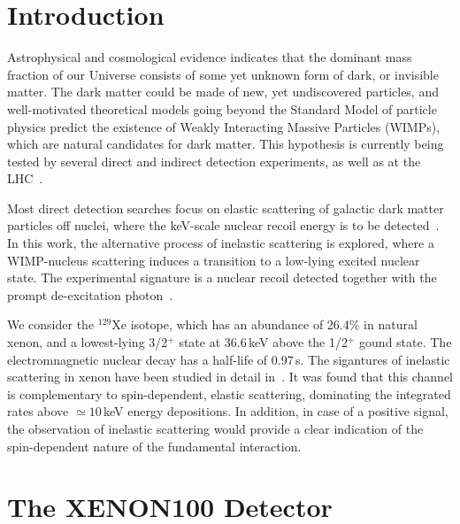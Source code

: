 \section{\label{sec:level1} Introduction}
Astrophysical and cosmological evidence indicates that the dominant mass fraction of our Universe consists of some yet unknown
form of dark, or invisible matter. The dark matter could be made of new, yet undiscovered particles, and well-motivated
theoretical models going beyond the Standard Model of particle physics predict the existence of Weakly Interacting Massive
Particles (WIMPs), which are natural candidates for dark matter. This hypothesis is currently being tested by several direct
and indirect detection experiments, as well as at the LHC~\cite{Bertone:2004pz,Baudis:2016qwx}.

Most direct detection searches focus on elastic scattering of galactic dark matter particles off nuclei, where the keV-scale 
nuclear recoil energy is to be detected~\cite{Baudis:2012ig,Baudis:2015mpa,Undagoitia:2015gya}. In this work, the 
alternative process of inelastic scattering is explored, where a WIMP-nucleus scattering induces a transition to a low-lying 
excited nuclear state. The experimental signature is a nuclear recoil detected together with the prompt de-excitation 
photon~\cite{Ellis:1988nb}. 

We consider the $^{129}\text{Xe}$ isotope, which has an abundance of 26.4\% in natural xenon, and a lowest-lying 
3/2$^{+}$ state at 36.6\,keV above the 1/2$^+$ gound state. The electromnagnetic nuclear decay has a half-life of 0.97\,s. 
The sigantures of inelastic scattering in xenon have been studied in detail in~\cite{Baudis:2013bba}. It was found that this 
channel is complementary to spin-dependent, elastic scattering, dominating the integrated rates above $\simeq10$\,keV energy 
depositions. In addition, in case of a positive signal, the observation of inelastic scattering would provide a clear 
indication of the spin-dependent nature of the fundamental interaction. 

\section{The XENON100 Detector}

